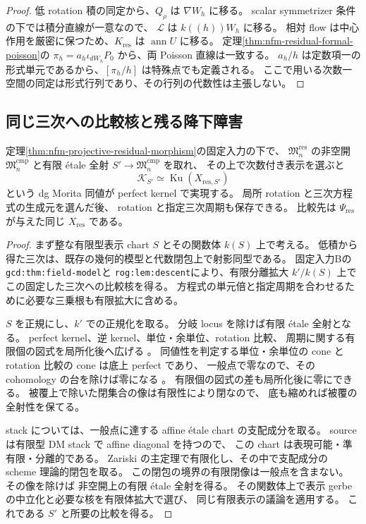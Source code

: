 \begin{proof}
低 rotation 積の同定から、$Q_\rho$ は $\nabla W_h$ に移る。
scalar symmetrizer 条件の下では積分直線が一意なので、
$\mathcal L$ は $k((h))W_h$ に移る。
相対 flow は中心作用を厳密に保つため、$K_{\mathrm{res}}$ は
$\operatorname{ann}U$ に移る。
定理\ref{thm:nfm-residual-formal-poisson}の
$\pi_h=a_h\iota_{dW_h}P_0$ から、両 Poisson 直線は一致する。
$a_h/h$ は定数項一の形式単元であるから、$[\pi_h/h]$ は特殊点でも定義される。
ここで用いる次数一空間の同定は形式行列であり、その行列の代数性は主張しない。
\end{proof}

\subsection{同じ三次への比較核と残る降下障害}

\begin{theorem}
\label{thm:nfm-residual-comparison-cover}
定理\ref{thm:nfm-projective-residual-morphism}の固定入力の下で、
$\mathfrak M_n^{\mathrm{res}}$ の非空開
$\mathfrak M_n^{\mathrm{cmp}}$ と有限 étale 全射
$S'\to\mathfrak M_n^{\mathrm{cmp}}$ を取れ、
その上で次数付き表示を選ぶと
\[
 \mathcal K_{S'}\simeq
 \operatorname{Ku}(X_{\mathrm{res},S'})
\]
という dg Morita 同値が perfect kernel で実現する。
局所 rotation と三次方程式の生成元を選んだ後、
rotation と指定三次周期も保存できる。
比較先は $\Psi_{\mathrm{res}}$ が与えた同じ $X_{\mathrm{res}}$ である。
\end{theorem}

\begin{proof}
まず整な有限型表示 chart $S$ とその関数体 $k(S)$ 上で考える。
低積から得た三次は、既存の幾何的模型と代数閉包上で射影同型である。
固定入力Bの \texttt{gcd:thm:field-model}と
\texttt{rog:lem:descent}により、有限分離拡大 $k'/k(S)$ 上で
この固定した三次への比較核を得る。
方程式の単元倍と指定周期を合わせるために必要な三乗根も有限拡大に含める。

$S$ を正規にし、$k'$ での正規化を取る。
分岐 locus を除けば有限 étale 全射となる。
perfect kernel、逆 kernel、単位・余単位、rotation 比較、
周期に関する有限個の図式を局所化後へ広げる
\cite[Lemma~2.10]{NFMToenVaquieModuli}。
同値性を判定する単位・余単位の cone と rotation 比較の cone は底上 perfect であり、
一般点で零なので、その cohomology の台を除けば零になる
\cite[Lemma~3.25 and its proof]{NFMToenVaquieModuli}。
有限個の図式の差も局所化後に零にできる。
被覆上で除いた閉集合の像は有限性により閉なので、
底も縮めれば被覆の全射性を保てる。

stack については、一般点に達する affine étale chart の支配成分を取る。
source は有限型 DM stack で affine diagonal を持つので、
この chart は表現可能・準有限・分離的である。
Zariski の主定理で有限化し、その中で支配成分の scheme 理論的閉包を取る。
この閉包の境界の有限閉像は一般点を含まない。
その像を除けば
非空開上の有限 étale 全射を得る。
その関数体上で表示 gerbe の中立化と必要な核を有限体拡大で選び、
同じ有限表示の議論を適用する。
これである $S'$ と所要の比較を得る。
\end{proof}

